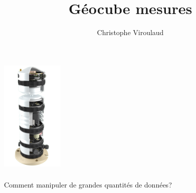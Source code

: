 \documentclass[svgnames,11pt]{beamer}
\author[]{Christophe Viroulaud}
\title{Géocube mesures}
\date{\framebox{\textbf{Donn 02}}}
\institute{Seconde - SNT}
\begin{document}
\begin{frame}
\titlepage
\end{frame}
\begin{frame}
    \frametitle{}
    \begin{center}
    \includegraphics[width=3cm]{ressources/geocube-interne.png}
    \end{center}

\end{frame}
\begin{frame}
    \frametitle{}

    \begin{framed}\centering
        Comment manipuler de grandes quantités de données? 
    \end{framed}

\end{frame}
\end{document}
